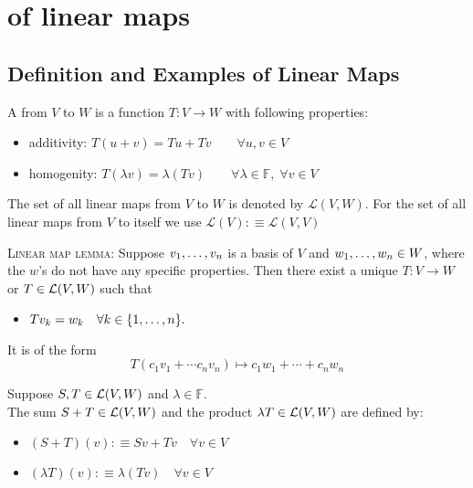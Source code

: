 \section{\vs of linear maps}

\subsection{Definition and Examples of Linear Maps}

\begin{mydef}
  A \lm from $V$ to $W$ is a function $T:V\to W$ with following properties:
  \begin{itemize}
    \item additivity: $T(u+v)=Tu + Tv \qquad \forall u,v \in V$
    \item homogenity: $T(\lambda v)=\lambda (Tv) \qquad
    \forall \lambda \in \mathbb{F}, \; \forall v\in V$
  \end{itemize}
\end{mydef}

\begin{mydef}
  The set of all linear maps from $V$ to $W$ is denoted by $\mathcal{L}(V,W)$. For the set of all linear maps from $V$ to itself we use $\mathcal{L}(V) :\equiv \mathcal{L}(V,V)$
\end{mydef}

\setcounter{thm}{3}
\begin{thm}
  {\scshape Linear map lemma: }
  Suppose $v_1, \dots, v_n$ is a basis of $V$ and $w_1, \dots, w_n \in W$, where the $w$'s do not have any specific properties. Then there exist a unique \lm $T:V\to W$ or $T \in \mathcal{L}(V,W)$ such that
  \begin{itemize}
    \item[] $Tv_{k} = w_k \quad \forall k \in \{1, \dots, n \}.$
  \end{itemize}
  It is of the form \begin{equation}
    T(c_1 v_1 + \cdots c_n v_n) \mapsto c_1 w_1 + \cdots + c_n w_n
  \end{equation}
\end{thm}

\setcounter{thm}{4}
\begin{mydef}
  Suppose $S, T \in {\mathcal{L}(V,W)}$ and $\lambda \in \mathbb{F}.$ \\
  The sum $S+T \in \mathcal{L} (V,W)$ and the product $\lambda T \in \mathcal{L} (V,W)$ are defined by:
  \begin{itemize}
    \item $(S+T)(v) :\equiv Sv+Tv \quad \forall v \in V$
    \item $(\lambda T)(v) : \equiv \lambda (Tv) \quad \forall v \in V$
  \end{itemize}
\end{mydef}

